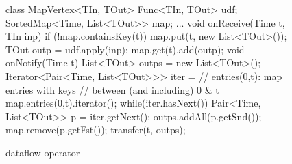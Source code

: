 \begin{figure}[t!]
\begin{numcodejava}
class MapVertex<TIn, TOut> {
  Func<TIn, TOut> udf;
  SortedMap<Time, List<TOut>> map;
  ...
  void onReceive(Time t, TIn inp) {
    if (!map.containsKey(t))
       map.put(t, new List<TOut>());
    TOut outp = udf.apply(inp);
    map.get(t).add(outp);
  }
  void onNotify(Time t) {
    List<TOut> outps = new List<TOut>();
    Iterator<Pair<Time, List<TOut>>> iter = 
        // entries(0,t):  map entries with keys 
        // between (and including) 0 & t
        map.entries(0,t).iterator();
    while(iter.hasNext()) {
      Pair<Time, List<TOut>> p = iter.getNext();
      outps.addAll(p.getSnd());
      map.remove(p.getFst());
    }
    transfer(t, outps);
  }
}
\end{numcodejava}
\caption{ dataflow operator}
\label{fig:motivating-eg}
\end{figure}
